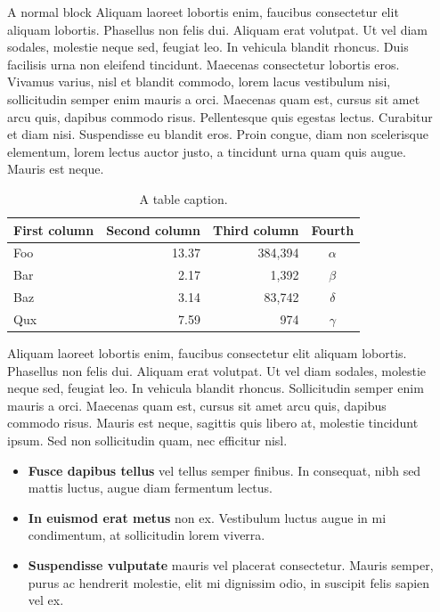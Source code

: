 \documentclass[final]{beamer}
\newlength{\sepwidth}
\newlength{\colwidth}
\newcommand{\separatorcolumn}{\begin{column}{\sepwidth}\end{column}}
\begin{document}
\begin{frame}[t]
\begin{columns}[t]
\separatorcolumn

\begin{column}{\colwidth}

  \begin{block}{A normal block}
  Aliquam laoreet lobortis enim, faucibus consectetur elit aliquam lobortis. Phasellus non felis dui. Aliquam erat volutpat. Ut vel diam sodales, molestie neque sed, feugiat leo. In vehicula blandit rhoncus. Duis facilisis urna non eleifend tincidunt. Maecenas consectetur lobortis eros. Vivamus varius, nisl et blandit commodo, lorem lacus vestibulum nisi, sollicitudin semper enim mauris a orci. Maecenas quam est, cursus sit amet arcu quis, dapibus commodo risus. Pellentesque quis egestas lectus. Curabitur et diam nisi. Suspendisse eu blandit eros. Proin congue, diam non scelerisque elementum, lorem lectus auctor justo, a tincidunt urna quam quis augue. Mauris est neque.
   


   \begin{table}
      \centering
       \caption{A table caption.}
      \begin{tabular}{l r r c}
        \toprule
        \textbf{First column} & \textbf{Second column} & \textbf{Third column} & \textbf{Fourth} \\
        \midrule
        Foo & 13.37 & 384,394 & $\alpha$ \\
        Bar & 2.17 & 1,392 & $\beta$ \\
        Baz & 3.14 & 83,742 & $\delta$ \\
        Qux & 7.59 & 974 & $\gamma$ \\
        \bottomrule
      \end{tabular}
     
    \end{table}

   Aliquam laoreet lobortis enim, faucibus consectetur elit aliquam lobortis. Phasellus non felis dui. Aliquam erat volutpat. Ut vel diam sodales, molestie neque sed, feugiat leo. In vehicula blandit rhoncus. Sollicitudin semper enim mauris a orci. Maecenas quam est, cursus sit amet arcu quis, dapibus commodo risus. Mauris est neque, sagittis quis libero at, molestie tincidunt ipsum. Sed non sollicitudin quam, nec efficitur nisl.
   

    
 
    \begin{itemize}
      \item \textbf{Fusce dapibus tellus} vel tellus semper finibus. In
        consequat, nibh sed mattis luctus, augue diam fermentum lectus.
      \item \textbf{In euismod erat metus} non ex. Vestibulum luctus augue in
        mi condimentum, at sollicitudin lorem viverra.
      \item \textbf{Suspendisse vulputate} mauris vel placerat consectetur.
        Mauris semper, purus ac hendrerit molestie, elit mi dignissim odio, in
        suscipit felis sapien vel ex.
    \end{itemize}
    

\end{block}
\end{column}
\end{columns}
\end{frame}
\end{document}
